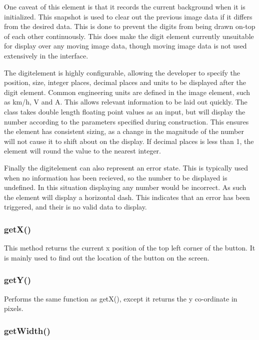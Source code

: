 One caveat of this element is that it records the current background when it is initialized. This snapshot is used to clear out the previous image data if it differs from the desired data. This is done to prevent the digits from being drawn on-top of each other continuously. This does make the digit element currently unsuitable for display over any moving image data, though moving image data is not used extensively in the interface.

The digitelement is highly configurable, allowing the developer to specify the position, size, integer places, decimal places and units to be displayed after the digit element. Common engineering units are defined in the image element, such as km/h, V and A. This allows relevant information to be laid out quickly. 
The class takes double length floating point values as an input, but will display the number according to the parameters specified during construction. This ensures the element has consistent sizing, as a change in the magnitude of the number will not cause it to shift about on the display. If decimal places is less than 1, the element will round the value to the nearest integer.

Finally the digitelement can also represent an error state. This is typically used when no information has been recieved, so the number to be displayed is undefined. In this situation displaying any number would be incorrect. As such the element will display a horizontal dash. This indicates that an error has been triggered, and their is no valid data to display. 

\subsubsection{getX()}

This method returns the current x position of the top left corner of the button. It is mainly used to find out the location of the button on the screen.

\subsubsection{getY()}

Performs the same function as getX(), except it returns the y co-ordinate in pixels.

\subsubsection{getWidth()}

